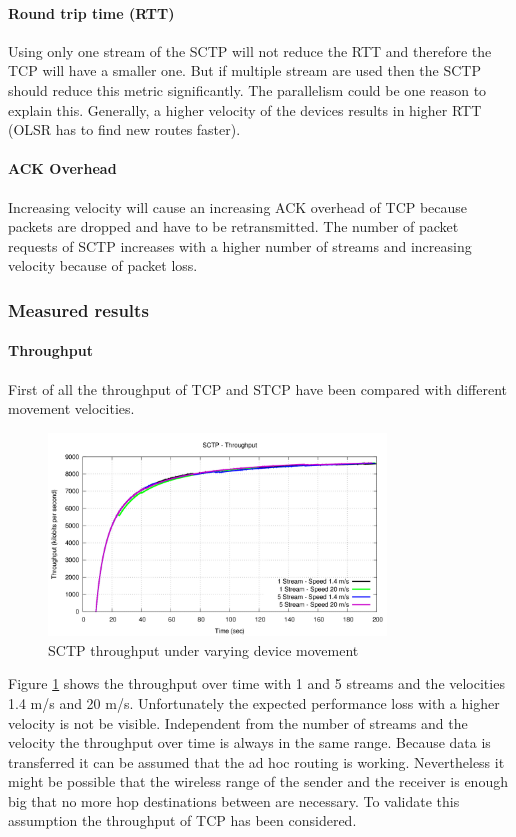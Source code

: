 \documentclass[a4paper]{article}
\begin{document}
\paragraph{Round trip time (RTT)}
Using only one stream of the SCTP will not reduce the RTT and therefore the TCP will have a smaller one. But if multiple stream are used then the SCTP should reduce this metric significantly. The parallelism could be one reason to explain this. Generally, a higher velocity of the devices results in higher RTT (OLSR has to find new routes faster).
\paragraph{ACK Overhead}
Increasing velocity will cause an increasing ACK overhead of TCP because packets are dropped and have to be retransmitted. The number of packet requests of SCTP increases with a higher number of streams and increasing velocity because of packet loss.

\subsubsection{Measured results}

\paragraph{Throughput}

First of all the throughput of TCP and STCP have been compared with different movement velocities. 

\begin{figure}[H]
	\centering
	\includegraphics[width=0.8\textwidth]{imgs/sctp-throughput.png}
	\caption{SCTP throughput under varying device movement}
	\label{fig:sctp-throughput}
\end{figure}

Figure \ref{fig:sctp-throughput} shows the throughput over time with 1 and 5 streams and the velocities 1.4 m/s and 20 m/s. Unfortunately the expected performance loss with a higher velocity is not be visible. Independent from the number of streams and the velocity the throughput over time is always in the same range. Because data is transferred it can be assumed that the ad hoc routing is working. Nevertheless it might be possible that the wireless range of the sender and the receiver is enough big that no more hop destinations between are necessary. To validate this assumption the throughput of TCP has been considered.
\end{document}
